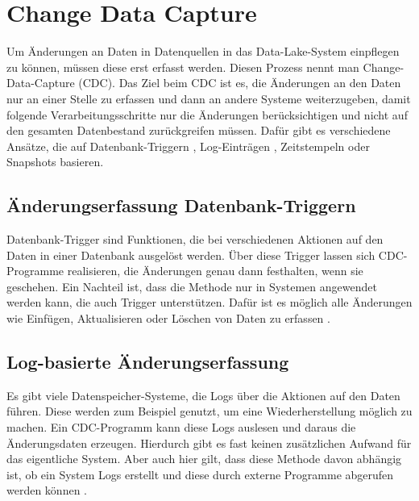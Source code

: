 \section{Change Data Capture}
\label{sec:cdc}

Um Änderungen an Daten in Datenquellen in das Data-Lake-System einpflegen zu können, müssen diese erst erfasst werden.
Diesen Prozess nennt man Change-Data-Capture (CDC).
Das Ziel beim CDC ist es, die Änderungen an den Daten nur an einer Stelle zu erfassen und dann an andere Systeme weiterzugeben, damit folgende Verarbeitungsschritte nur die Änderungen berücksichtigen und nicht auf den gesamten Datenbestand zurückgreifen müssen.
Dafür gibt es verschiedene Ansätze, die auf Datenbank-Triggern \parencite{boeing}, Log-Einträgen \parencite{delta-view_gen}, Zeitstempeln \parencite{delta-view_gen, boeing} oder Snapshots \parencite{cdc_in_nosql} basieren.

\subsection{Änderungserfassung Datenbank-Triggern}
Datenbank-Trigger sind Funktionen, die bei verschiedenen Aktionen auf den Daten in einer Datenbank ausgelöst werden.
Über diese Trigger lassen sich CDC-Programme realisieren, die Änderungen genau dann festhalten, wenn sie geschehen.
Ein Nachteil ist, dass die Methode nur in Systemen angewendet werden kann, die auch Trigger unterstützen.
Dafür ist es möglich alle Änderungen wie Einfügen, Aktualisieren oder Löschen von Daten zu erfassen \parencite{boeing}.

\subsection{Log-basierte Änderungserfassung}
Es gibt viele Datenspeicher-Systeme, die Logs über die Aktionen auf den Daten führen.
Diese werden zum Beispiel genutzt, um eine Wiederherstellung möglich zu machen.
Ein CDC-Programm kann diese Logs auslesen und daraus die Änderungsdaten erzeugen.
Hierdurch gibt es fast keinen zusätzlichen Aufwand für das eigentliche System.
Aber auch hier gilt, dass diese Methode davon abhängig ist, ob ein System Logs erstellt und diese durch externe Programme abgerufen werden können \parencite{delta-view_gen}.


